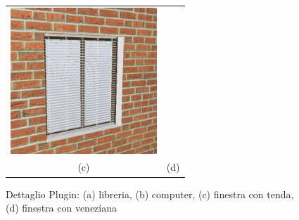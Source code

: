 \begin{figure}[htbp]
\begin{center}
\begin{tabular}{c @{\hspace{1em}} c}
\includegraphics[width=5.5cm]{images/veneziana} \\
 (c) & (d) \\
\end{tabular}
\end{center}
\caption{Dettaglio Plugin: (a) libreria, (b) computer, (c) finestra con tenda, (d) finestra con veneziana}\label{fig:figura4}
\end{figure}

\newpage
